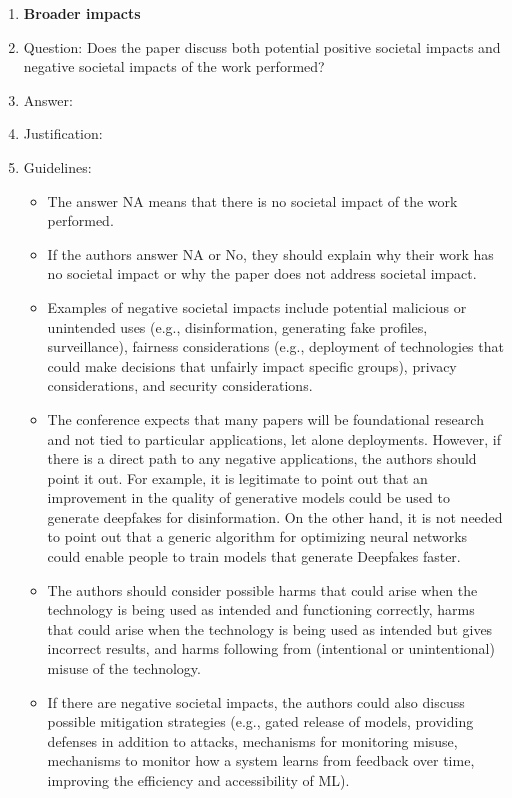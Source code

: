 \documentclass{article}
\begin{document}
\begin{enumerate}
\item {\bf Broader impacts}
    \item[] Question: Does the paper discuss both potential positive societal impacts and negative societal impacts of the work performed?
    \item[] Answer: \answerNA{} %
    \item[] Justification: 
    \item[] Guidelines:
    \begin{itemize}
        \item The answer NA means that there is no societal impact of the work performed.
        \item If the authors answer NA or No, they should explain why their work has no societal impact or why the paper does not address societal impact.
        \item Examples of negative societal impacts include potential malicious or unintended uses (e.g., disinformation, generating fake profiles, surveillance), fairness considerations (e.g., deployment of technologies that could make decisions that unfairly impact specific groups), privacy considerations, and security considerations.
        \item The conference expects that many papers will be foundational research and not tied to particular applications, let alone deployments. However, if there is a direct path to any negative applications, the authors should point it out. For example, it is legitimate to point out that an improvement in the quality of generative models could be used to generate deepfakes for disinformation. On the other hand, it is not needed to point out that a generic algorithm for optimizing neural networks could enable people to train models that generate Deepfakes faster.
        \item The authors should consider possible harms that could arise when the technology is being used as intended and functioning correctly, harms that could arise when the technology is being used as intended but gives incorrect results, and harms following from (intentional or unintentional) misuse of the technology.
        \item If there are negative societal impacts, the authors could also discuss possible mitigation strategies (e.g., gated release of models, providing defenses in addition to attacks, mechanisms for monitoring misuse, mechanisms to monitor how a system learns from feedback over time, improving the efficiency and accessibility of ML).
    \end{itemize}
    

\end{enumerate}
\end{document}
